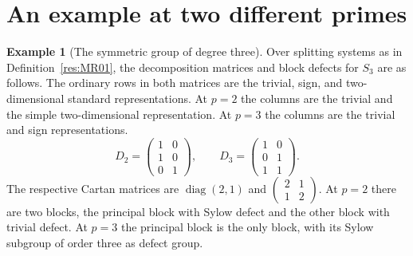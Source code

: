\documentclass[11pt,oneside,openany]{book}
\theoremstyle{definition}
\newtheorem{example}[theorem]{Example}
\theoremstyle{remark}
\begin{document}
\section{An example at two different primes}

\begin{example}[The symmetric group of degree three]
\label{res:MR14}
Over splitting systems as in Definition~\ref{res:MR01},
the decomposition matrices and block defects for \(S_3\)
are as follows. The ordinary rows in both matrices are
the trivial, sign, and two-dimensional standard representations.
At \(p=2\) the columns are the trivial and the simple
two-dimensional representation. At \(p=3\) the columns
are the trivial and sign representations.
\[
 D_2=\begin{pmatrix}1&0\\1&0\\0&1\end{pmatrix},
 \qquad
 D_3=\begin{pmatrix}1&0\\0&1\\1&1\end{pmatrix}.
\]
The respective Cartan matrices are
\(\operatorname{diag}(2,1)\) and
\(\left(\begin{smallmatrix}2&1\\1&2\end{smallmatrix}\right)\).
At \(p=2\) there are two blocks, the principal block with
Sylow defect and the other block with trivial defect.
At \(p=3\) the principal block is the only block, with its
Sylow subgroup of order three as defect group.
\end{example}
\end{document}
